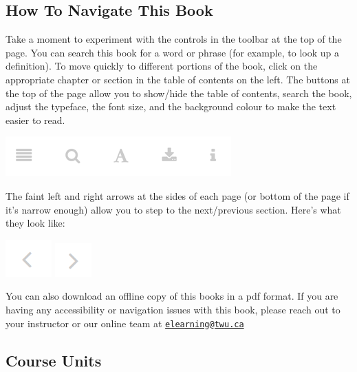 \documentclass[
]{book}
\begin{document}
\hypertarget{how-to-navigate-this-book}{%
\subsection*{How To Navigate This Book}\label{how-to-navigate-this-book}}

Take a moment to experiment with the controls in the toolbar at the top of the page. You can search this book for a word or phrase (for example, to look up a definition). To move quickly to different portions of the book, click on the appropriate chapter or section in the table of contents on the left. The buttons at the top of the page allow you to show/hide the table of contents, search the book, adjust the typeface, the font size, and the background colour to make the text easier to read.

\includegraphics{assets/course-intro/menu.png}

The faint left and right arrows at the sides of each page (or bottom of the page if it's narrow enough) allow you to step to the next/previous section. Here's what they look like:

\includegraphics{assets/course-intro/left_arrow.png} \includegraphics{assets/course-intro/right_arrow.png}

You can also download an offline copy of this books in a pdf format. If you are having any accessibility or navigation issues with this book, please reach out to your instructor or our online team at \href{mailto:elearning@twu.ca}{\nolinkurl{elearning@twu.ca}}

\hypertarget{course-units}{%
\subsection*{Course Units}\label{course-units}}
\end{document}
